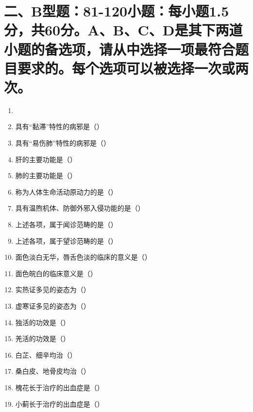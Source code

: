\documentclass[a4paper,11pt]{ctexart}
\begin{document}
\section*{\large 二、B型题：81-120小题：每小题1.5分，共60分。A、B、C、D是其下两道小题的备选项，请从中选择一项最符合题目要求的。每个选项可以被选择一次或两次。}

\begin{enumerate}[resume]
      \item[]
      \item 具有“黏滞”特性的病邪是（\quad）
      \item 具有“易伤肺”特性的病邪是（\quad）
      \item 肝的主要功能是（\quad）
      \item 肺的主要功能是（\quad）
      \item 称为人体生命活动原动力的是（\quad）
      \item 具有温煦机体、防御外邪入侵功能的是（\quad）
      \item 上述各项，属于闻诊范畴的是（\quad）
      \item 上述各项，属于望诊范畴的是（\quad）
      \item 面色淡白无华，唇舌色淡的临床的意义是（\quad）
      \item 面色皖白的临床意义是（\quad）
      \item 实热证多见的姿态为（\quad）
      \item 虚寒证多见的姿态为（\quad）
      \item 独活的功效是（\quad）
      \item 羌活的功效是（\quad）
      \item 白芷、细辛均治（\quad）
      \item 桑白皮、地骨皮均治（\quad）
      \item 槐花长于治疗的出血症是（\quad）
      \item 小蓟长于治疗的出血症是（\quad）

\end{enumerate}
\end{document}
